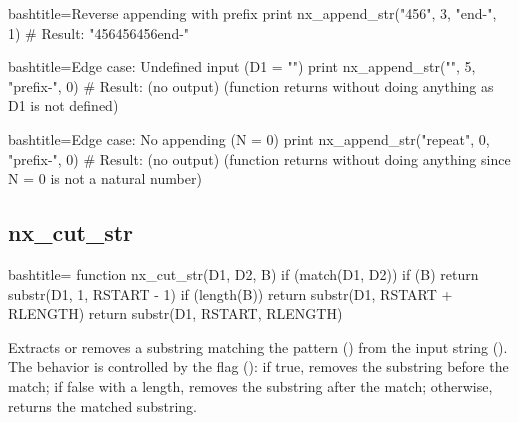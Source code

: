 \begin{NexCodeBox}{bash}{title={Reverse appending with prefix}}
	print nx_append_str("456", 3, "end-", 1)
	# Result: "456456456end-"
\end{NexCodeBox}

\begin{NexCodeBox}{bash}{title={Edge case: Undefined input (D1 = "")}}
	print nx_append_str("", 5, "prefix-", 0)
	# Result: (no output) (function returns without doing anything as D1 is not defined)
\end{NexCodeBox}

\begin{NexCodeBox}{bash}{title={Edge case: No appending (N = 0)}}
	print nx_append_str("repeat", 0, "prefix-", 0)
	# Result: (no output) (function returns without doing anything since N = 0 is not a natural number)
\end{NexCodeBox}

\newpage
\subsection{nx_cut_str}
\label{nx_cut_str}
\begin{NexCodeBox}{bash}{title={}}
function nx_cut_str(D1, D2, B) {
	if (match(D1, D2)) {
		if (B)
			return substr(D1, 1, RSTART - 1)
		if (length(B))
			return substr(D1, RSTART + RLENGTH)
		return substr(D1, RSTART, RLENGTH)
	}
}
\end{NexCodeBox}

\begin{NexMainBox}
	\begin{NexMainBox}
		Extracts or removes a substring matching the pattern () from the input string (). The behavior is controlled by the flag (): if true, removes the substring before the match; if false with a length, removes the substring after the match; otherwise, returns the matched substring.
	\end{NexMainBox}
	\begin{NexMainBox}
		\begin{NexListDark}
		\end{NexListDark}
	\end{NexMainBox}
\end{NexMainBox}


